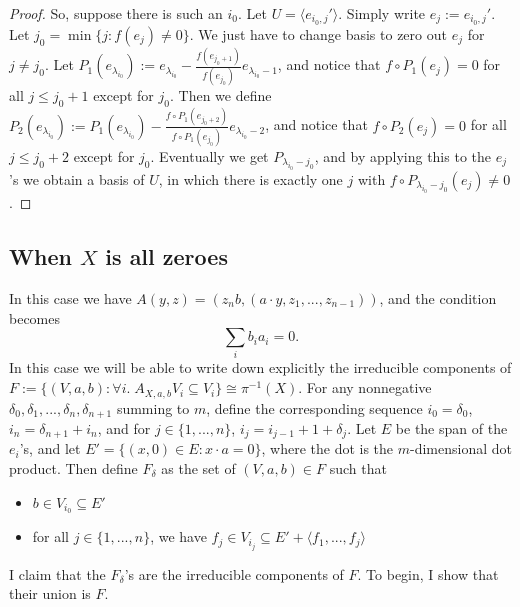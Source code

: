 \documentclass[12pt,psamsfonts]{article}
\begin{document}
\begin{proof}
    So, suppose there is such an \(i_0\).
    Let \(U = \langle e_{i_0, j}' \rangle\).
    Simply write \(e_j := e_{i_0, j}'\).
    Let \(j_0 = \min\{j : f(e_j) \neq 0\}\).
    We just have to change basis to zero out \(e_j\) for \(j \neq j_0\).
    Let \(P_1(e_{\lambda_{i_0}}) := e_{\lambda_{i_0}} - \frac{f(e_{j_0 + 1})}{f(e_{j_0})} e_{\lambda_{i_0} - 1}\), and notice that \(f \circ P_1(e_j) = 0\) for all \(j \leq j_0 + 1\) except for \(j_0\).
    Then we define \(P_2(e_{\lambda_{i_0}}) := P_1(e_{\lambda_{i_0}}) - \frac{f\circ P_1(e_{j_0 + 2})}{f\circ P_1(e_{j_0})} e_{\lambda_{i_0} - 2}\), and notice that \(f \circ P_2(e_j) = 0\) for all \(j \leq j_0 + 2\) except for \(j_0\).    
    Eventually we get \(P_{\lambda_{i_0} - j_0}\), and by applying this to the \(e_j\)'s we obtain a basis of \(U\), in which there is exactly one \(j\) with \(f \circ P_{\lambda_{i_0} - j_0}(e_j) \neq 0\).
\end{proof}

\subsection{When \(X\) is all zeroes}
In this case we have \(A(y, z) = (z_n b, (a \cdot y, z_1, ..., z_{n - 1}))\), and the condition becomes
\[\sum_i b_i a_i = 0.\]
In this case we will be able to write down explicitly the irreducible components of \(F := \{(V, a, b) : \forall i. \; A_{X, a, b} V_i \subseteq V_i\} \cong \pi^{-1}(X)\).
For any nonnegative \(\delta_0, \delta_1, ..., \delta_n, \delta_{n + 1}\) summing to \(m\), define the corresponding sequence \(i_0 = \delta_0\), \(i_n = \delta_{n + 1} + i_n\), and for \(j \in \{1, ..., n\}\), \(i_j = i_{j - 1} + 1 + \delta_j\).
Let \(E\) be the span of the \(e_i\)'s, and let \(E' = \{(x, 0) \in E : x \cdot a = 0\}\), where the dot is the \(m\)-dimensional dot product.
Then define \(F_\delta\) as the set of \((V, a, b) \in F\) such that 
\begin{itemize}
    \item \(b \in V_{i_0} \subseteq E'\)
    \item for all \(j \in \{1, ..., n\}\), we have \(f_j \in V_{i_j} \subseteq E' + \langle f_1, ..., f_j \rangle\)
\end{itemize}
I claim that the \(F_\delta\)'s are the irreducible components of \(F\).
To begin, I show that their union is \(F\).
\end{document}
